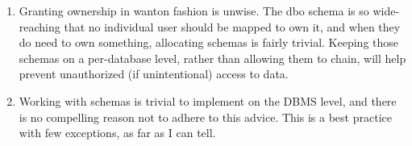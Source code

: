 \begin{enumerate}
  \begin{enumerate}
  \def\labelenumii{\arabic{enumii}.}
  \item
    Granting ownership in wanton fashion is unwise. The dbo schema is so
    wide-reaching that no individual user should be mapped to own it,
    and when they do need to own something, allocating schemas is fairly
    trivial. Keeping those schemas on a per-database level, rather than
    allowing them to chain, will help prevent unauthorized (if
    unintentional) access to data.
  \item
    Working with schemas is trivial to implement on the DBMS level, and
    there is no compelling reason not to adhere to this advice. This is
    a best practice with few exceptions, as far as I can tell.
  \end{enumerate}
\end{enumerate}

